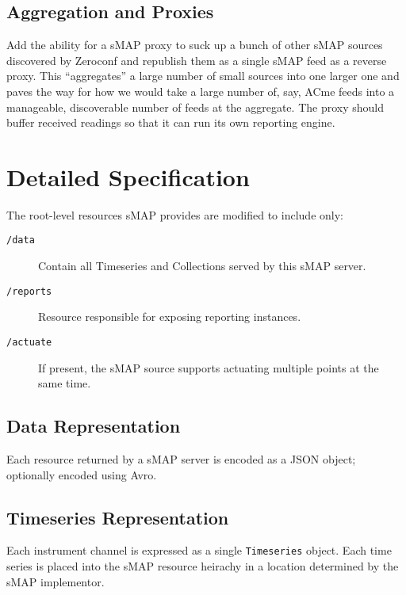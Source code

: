 \documentclass[10pt,letterpaper]{article}
\newcommand{\smap}{sMAP}
\begin{document}
\subsection{Aggregation and Proxies}
Add the ability for a \smap{} proxy to suck up a bunch of other \smap{}
sources discovered by Zeroconf and republish them as a single \smap{} feed as
a reverse proxy.  This ``aggregates'' a large number of small sources into one
larger one and paves the way for how we would take a large number of, say,
ACme feeds into a manageable, discoverable number of feeds at the aggregate.
The proxy should buffer received readings so that it can run its own reporting
engine.

\section{Detailed Specification}

The root-level resources \smap{} provides are modified to include only:
\begin{description}
\item[{\tt /data}] Contain all Timeseries and Collections served by this
  \smap{} server.
\item[{\tt /reports}] Resource responsible for exposing reporting instances.
\item[{\tt /actuate}] If present, the \smap{} source supports actuating
  multiple points at the same time.
\end{description}

\subsection{Data Representation}

Each resource returned by a \smap{} server is encoded as a JSON object;
optionally encoded using Avro. %

\subsection{Timeseries Representation}

Each instrument channel is expressed as a single {\tt Timeseries} object.
Each time series is placed into the \smap{} resource heirachy in a location
determined by the \smap{} implementor.
\end{document}
